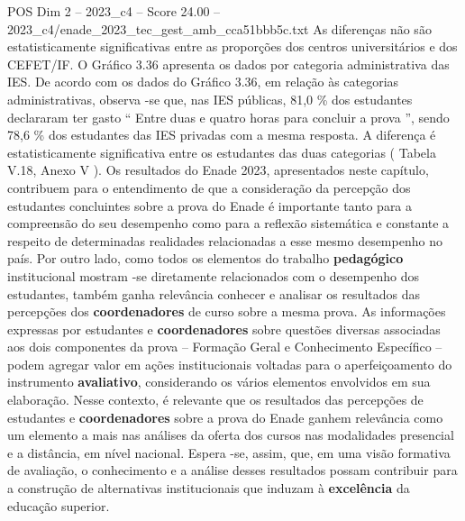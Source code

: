 \begin{textsample}{POS Dim 2 – 2023\_c4 – Score 24.00 – 2023\_c4/enade\_2023\_tec\_gest\_amb\_cca51bbb5c.txt}
As diferenças não são estatisticamente significativas entre as proporções dos centros universitários e dos CEFET/IF.
O Gráfico 3.36 apresenta os dados por categoria administrativa das IES.
De acordo com os dados do Gráfico 3.36, em relação às categorias administrativas, observa -se que, nas IES públicas, 81,0 \% dos estudantes declararam ter gasto “ Entre duas e quatro horas para concluir a prova ”, sendo 78,6 \% dos estudantes das IES privadas com a mesma resposta.
A diferença é estatisticamente significativa entre os estudantes das duas categorias ( Tabela V.18, Anexo V ).
Os resultados do Enade 2023, apresentados neste capítulo, contribuem para o entendimento de que a consideração da percepção dos estudantes concluintes sobre a prova do Enade é importante tanto para a compreensão do seu desempenho como para a reflexão sistemática e constante a respeito de determinadas realidades relacionadas a esse mesmo desempenho no país.
Por outro lado, como todos os elementos do trabalho \textbf{pedagógico} institucional mostram -se diretamente relacionados com o desempenho dos estudantes, também ganha relevância conhecer e analisar os resultados das percepções dos \textbf{coordenadores} de curso sobre a mesma prova.
As informações expressas por estudantes e \textbf{coordenadores} sobre questões diversas associadas aos dois componentes da prova – Formação Geral e Conhecimento Específico – podem agregar valor em ações institucionais voltadas para o aperfeiçoamento do instrumento \textbf{avaliativo}, considerando os vários elementos envolvidos em sua elaboração.
Nesse contexto, é relevante que os resultados das percepções de estudantes e \textbf{coordenadores} sobre a prova do Enade ganhem relevância como um elemento a mais nas análises da oferta dos cursos nas modalidades presencial e a distância, em nível nacional.
Espera -se, assim, que, em uma visão formativa de avaliação, o conhecimento e a análise desses resultados possam contribuir para a construção de alternativas institucionais que induzam à \textbf{excelência} da educação superior.

\end{textsample}
